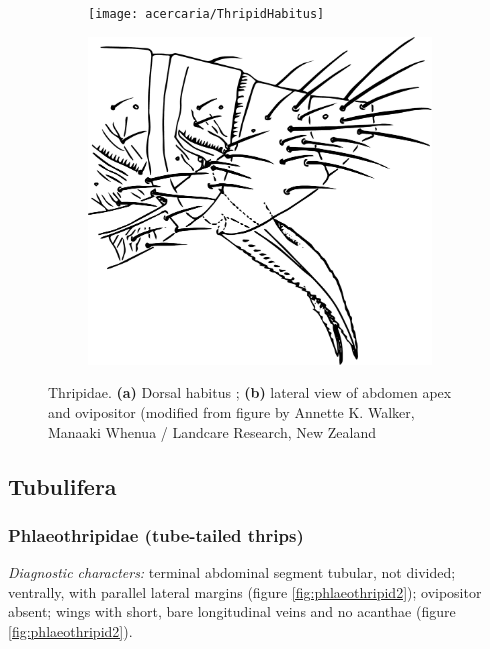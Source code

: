 \begin{figure}[ht!]
 \centering
 \begin{subfigure}[ht!]{0.48\textwidth}
  \texttt{[image: acercaria/ThripidHabitus]}
  \caption{}
  \label{fig:thripid1}
 \end{subfigure}
 \qquad
 \begin{subfigure}[ht!]{0.32\textwidth}
      \includegraphics[width=\textwidth]{sections/img/acercaria/TerebrantiaOvipositor.pdf}
  \caption{}
  \label{fig:thripid2}
 \end{subfigure}
 \caption{Thripidae. \textbf{(a)} Dorsal habitus \citep[][Fig. 150]{bhlitem38199}; \textbf{(b)} lateral view of abdomen apex and ovipositor (modified from figure by Annette K. Walker, Manaaki Whenua / Landcare Research, New Zealand}\label{fig:thripid}
\end{figure}

\subsection{Tubulifera}
\subsubsection{Phlaeothripidae (tube-tailed thrips)}
\noindent{}\textit{Diagnostic characters:} terminal abdominal segment tubular, not divided; ventrally, with parallel lateral margins (figure \ref{fig:phlaeothripid2}); ovipositor absent; wings with short, bare longitudinal veins and no acanthae (figure \ref{fig:phlaeothripid2}).\vspace{3mm}

